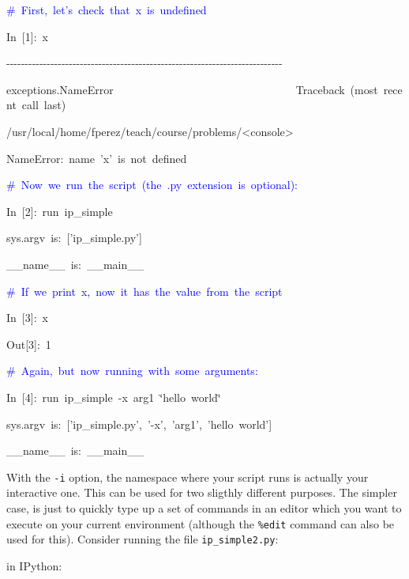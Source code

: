 \begin{lyxcode}
\textcolor{blue}{\#~First,~let's~check~that~x~is~undefined}

In~{[}1]:~x

-{}-{}-{}-{}-{}-{}-{}-{}-{}-{}-{}-{}-{}-{}-{}-{}-{}-{}-{}-{}-{}-{}-{}-{}-{}-{}-{}-{}-{}-{}-{}-{}-{}-{}-{}-{}-{}-{}-{}-{}-{}-{}-{}-{}-{}-{}-{}-{}-{}-{}-{}-{}-{}-{}-{}-{}-{}-{}-{}-{}-{}-{}-{}-{}-{}-{}-{}-{}-{}-{}-{}-{}-{}-{}-

exceptions.NameError~~~~~~~~~~~~~~~~~~~~~~~~~~~~~~~~~Traceback~(most~recent~call~last)

/usr/local/home/fperez/teach/course/problems/<console>

NameError:~name~'x'~is~not~defined



\textcolor{blue}{\#~Now~we~run~the~script~(the~.py~extension~is~optional):}

In~{[}2]:~run~ip\_simple

sys.argv~is:~{[}'ip\_simple.py']

\_\_name\_\_~is:~\_\_main\_\_



\textcolor{blue}{\#~If~we~print~x,~now~it~has~the~value~from~the~script}

In~{[}3]:~x

Out{[}3]:~1



\textcolor{blue}{\#~Again,~but~now~running~with~some~arguments:}

In~{[}4]:~run~ip\_simple~-x~arg1~\char`\"{}hello~world\char`\"{}

sys.argv~is:~{[}'ip\_simple.py',~'-x',~'arg1',~'hello~world']

\_\_name\_\_~is:~\_\_main\_\_
\end{lyxcode}
With the \texttt{-i} option, the namespace where your script runs
is actually your interactive one. This can be used for two sligthly
different purposes. The simpler case, is just to quickly type up a
set of commands in an editor which you want to execute on your current
environment (although the \texttt{\%edit} command can also be used
for this). Consider running the file \texttt{ip\_simple2.py}:

in IPython:

